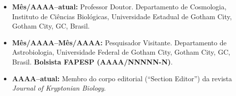 \begin{itemize}
    \item \textbf{Mês/AAAA--atual:} Professor Doutor. Departamento de Cosmologia, Instituto de Ciências Biológicas, Universidade Estadual de Gotham City, Gotham City, GC, Brasil.
    \item \textbf{Mês/AAAA--Mês/AAAA:} Pesquisador Visitante. Departamento de Astrobiologia, Universidade Federal de Gotham City, Gotham City, GC, Brasil. \textbf{Bolsista FAPESP (AAAA/NNNNN-N)}.
    \item \textbf{AAAA--atual:} Membro do corpo editorial (``Section Editor'') da revista \emph{Journal of Kryptonian Biology}.
\end{itemize}
